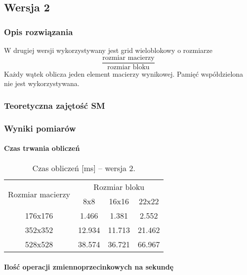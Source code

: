 
\subsection{Wersja 2}

\subsubsection{Opis rozwiązania}

W drugiej wersji wykorzystywany jest grid wieloblokowy o rozmiarze $$ \frac{\text{rozmiar macierzy}}{\text{rozmiar bloku}} $$
Każdy wątek oblicza jeden element macierzy wynikowej. Pamięć współdzielona nie jest wykorzystywana.



\subsubsection{Teoretyczna zajętość SM}

\subsubsection{Wyniki pomiarów}

\paragraph{Czas trwania obliczeń}

\begin{table}[H]
\centering
\begin{tabular}{|c|c|c|c|}
\hline
\multirow{2}{*}{Rozmiar macierzy} & \multicolumn{3}{c|}{Rozmiar bloku} \\ \cline{2-4}
& 8x8 & 16x16 & 22x22 \\ \hline
176x176 & 1.466 & 1.381 & 2.552 \\ \hline
352x352 & 12.934 & 11.713 & 21.462 \\ \hline
528x528 & 38.574 & 36.721 & 66.967 \\ \hline
\end{tabular}
\caption{Czas obliczeń [ms] -- wersja 2.}
\end{table}

\paragraph{Ilość operacji zmiennoprzecinkowych na sekundę}

